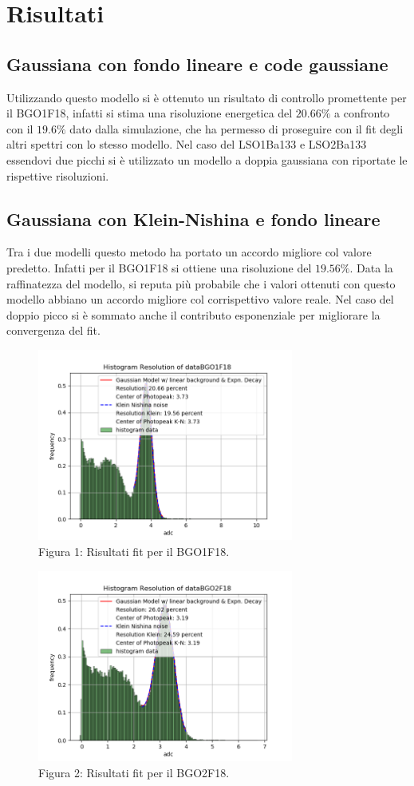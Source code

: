 \documentclass[a4paper]{article}
\begin{document}
\section{Risultati}
\subsection{Gaussiana con fondo lineare e code gaussiane}
Utilizzando questo modello si è ottenuto un risultato di controllo promettente per il BGO1F18, infatti si stima una risoluzione energetica del $20.66\%$ a confronto con il $19.6\%$ dato dalla simulazione, che ha permesso di proseguire con il fit degli altri spettri con lo stesso modello. Nel caso del LSO1Ba133 e LSO2Ba133 essendovi due picchi si è utilizzato un modello a doppia gaussiana con riportate le rispettive risoluzioni.
\subsection{Gaussiana con Klein-Nishina e fondo lineare}
Tra i due modelli questo metodo ha portato un accordo migliore col valore predetto. Infatti per il BGO1F18 si ottiene una risoluzione del $19.56\%$. Data la raffinatezza del modello, si reputa più probabile che i valori ottenuti con questo modello abbiano un accordo migliore col corrispettivo valore reale. Nel caso del doppio picco si è sommato anche il contributo esponenziale per migliorare la convergenza del fit.
\begin{figure}[H]
\centering
\includegraphics[width=0.75\textwidth]{histkleindataBGO1F18}
\caption{Figura 1: Risultati fit per il BGO1F18.}
\end{figure}
\begin{figure}[H]
\centering
\includegraphics[width=0.75\textwidth]{histkleindataBGO2F18}
\caption{Figura 2: Risultati fit per il BGO2F18.}
\end{figure}
\end{document}
